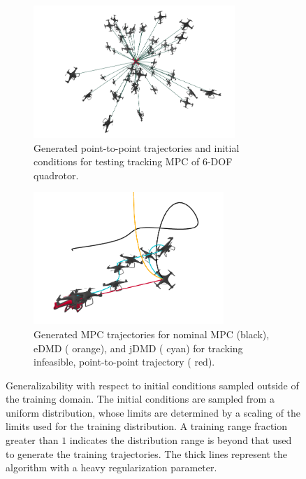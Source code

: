 \documentclass{article}
\begin{document}
\begin{figure}[t] \centering
	\begin{subfigure}[t]{0.49\textwidth}
		\centering
		\includegraphics[width=\textwidth,height=5cm]{full_quadrotor_test_linear_trajectories.png}
		\caption{Generated point-to-point trajectories and initial conditions for testing tracking MPC of 6-DOF quadrotor.}
		\label{fig:rex_full_quadrotor_initial_conditions}
	\end{subfigure}
	\hfill
	\begin{subfigure}[t]{0.49\textwidth}
		\raggedright
		\includegraphics[width=\textwidth, height=5cm]{jdmd_full_quad_pointtopoint_with_waypoints.png}
		\caption{Generated MPC trajectories for nominal MPC (black), eDMD (\color{orange} orange\color{black}), and jDMD (\color{cyan} cyan\color{black})
    for tracking infeasible, point-to-point trajectory (\color{red} red\color{black}).}
		\label{fig:jdmd_full_quad_pointtopoint_with_waypoints}
	\end{subfigure}
	\caption{Generalizability with respect to initial conditions sampled outside of the 
		training domain. The initial conditions are sampled from a uniform distribution, whose 
		limits are determined by a scaling of the limits used for the training distribution. 
		A training range fraction greater than $1$ indicates the
		distribution range is beyond that used to generate the training trajectories. The thick 
		lines represent the algorithm with a heavy regularization parameter.
	}
	\label{fig:training_window}
\end{figure}
\end{document}
